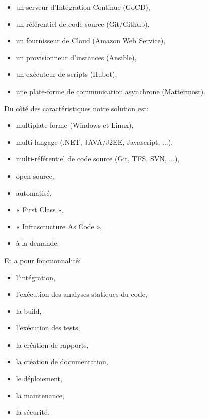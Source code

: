       \begin{itemize}
        \item un serveur d'Intégration Continue (GoCD),
        \item un référentiel de code source (Git/Github),
        \item un fournisseur de Cloud (Amazon Web Service),
        \item un provisionneur d'instances (Ansible),
        \item un exécuteur de scripts (Hubot),
        \item une plate-forme de communication asynchrone (Mattermost).\\
      \end{itemize}

      Du côté des caractéristiques notre solution est:\\

      \begin{itemize}
        \item multiplate-forme (Windows et Linux),
        \item multi-langage (.NET, JAVA/J2EE, Javascript, ...),
        \item multi-référentiel de code source (Git, TFS, SVN, ...),
        \item open source,
        \item automatisé,
        \item « First Class »,
        \item « Infrasctucture As Code »,
        \item à la demande.
      \end{itemize}

      Et a pour fonctionnalité:\\

      \begin{itemize}
        \item l'intégration,
        \item l'exécution des analyses statiques du code,
        \item la build,
        \item l'exécution des tests,
        \item la création de rapports,
        \item la création de documentation,
        \item le déploiement,
        \item la maintenance,
        \item la sécurité.\\
      \end{itemize}

